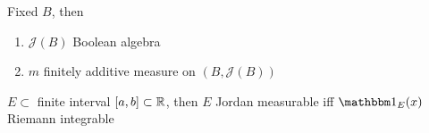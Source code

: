 \begin{prop}
    Fixed $B$, then
    \begin{enumerate}
        \item $\mathcal{J}(B)$ Boolean algebra
        \item $m$ finitely additive measure on $(B, \mathcal{J}(B))$
    \end{enumerate}
\end{prop}

\begin{fact}
    $E \subset$ finite interval $[a, b] \subset \mathbb{R}$, then $E$ Jordan measurable iff $\In_E(x)$ Riemann integrable
\end{fact}